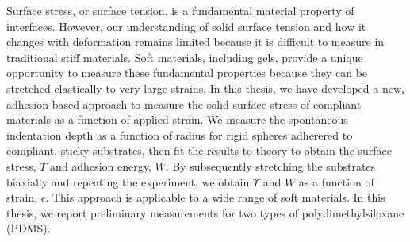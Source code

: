 


Surface stress, or surface tension, is a fundamental material property of interfaces. However, our understanding of solid surface tension and how it changes with deformation remains limited because it is difficult to measure in traditional stiff materials. Soft materials, including gels, provide a unique opportunity to measure these fundamental properties because they can be stretched elastically to very large strains. In this thesis, we have developed a new, adhesion-based approach to measure the solid surface stress of compliant materials as a function of applied strain. We measure the spontaneous indentation depth as a function of radius for rigid spheres adherered to compliant, sticky substrates, then fit the results to theory to obtain the surface stress, $ \Upsilon $ and adhesion energy, $ W $. By subsequently stretching the substrates biaxially and repeating the experiment, we obtain $ \Upsilon $ and $ W $ as a function of strain, $ \epsilon $. This approach is applicable to a wide range of soft materials. In this thesis, we report preliminary measurements for two types of polydimethylsiloxane (PDMS). 
